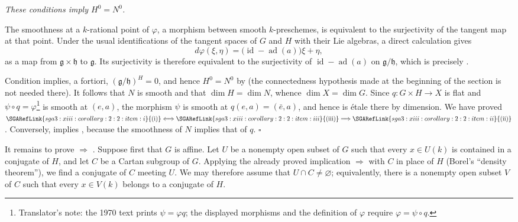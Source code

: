\textit{These conditions imply \(H^0=N^0\).}

The smoothness at a \(k\)-rational point of \(\varphi\), a morphism
between smooth \(k\)-preschemes, is equivalent to the surjectivity of
the tangent map at that point. Under the usual identifications of
the tangent spaces of \(G\) and \(H\) with their Lie algebras, a
direct calculation gives
\[
  d\varphi(\xi,\eta)
  =\bigl(\operatorname{id}-\operatorname{ad}(a)\bigr)\xi+\eta,
\]
as a map from \(\mathfrak g\times\mathfrak h\) to \(\mathfrak g\).
Its surjectivity is therefore equivalent to the surjectivity of
\(\operatorname{id}-\operatorname{ad}(a)\) on
\(\mathfrak g/\mathfrak h\), which is precisely .

Condition  implies, a fortiori,
\((\mathfrak g/\mathfrak h)^H=0\), and hence \(H^0=N^0\) by 
(the connectedness hypothesis made at the beginning of the section
is not needed there). It follows that \(N\) is smooth and that
\(\dim H=\dim N\), whence \(\dim X=\dim G\). Since
\(q:G\times H\to X\) is flat and
\(\psi\circ q=\varphi\)\footnote{Translator's note: the 1970 text
prints \(\psi=\varphi q\); the displayed morphisms and the definition of
\(\varphi\) require \(\varphi=\psi\circ q\).} is smooth
at \((e,a)\), the morphism \(\psi\)
is smooth at \(q(e,a)=(\bar e,a)\), and hence is étale there by
dimension. We have proved
\(\SGARefLink{sga3:xiii:corollary:2:2:item:i}{\mathrm{(i)}}\Longleftrightarrow\SGARefLink{sga3:xiii:corollary:2:2:item:iii}{\mathrm{(iii)}}
\Longrightarrow\SGARefLink{sga3:xiii:corollary:2:2:item:ii}{\mathrm{(ii)}}\). Conversely,  implies ,
because the smoothness of \(N\) implies that of \(q\).
\hfill\(\square\)

It remains to prove  \(\Rightarrow\) . Suppose first that
\(G\) is affine. Let \(U\) be a nonempty open subset of \(G\) such
that every \(x\in U(k)\) is contained in a conjugate of \(H\), and
let \(C\) be a Cartan subgroup of \(G\). Applying the already proved
implication  \(\Rightarrow\)  with \(C\) in place of \(H\)
(Borel's ``density theorem''), we find a conjugate of \(C\) meeting
\(U\). We may therefore assume that \(U\cap C\neq\varnothing\);
equivalently, there is a nonempty open subset \(V\) of \(C\) such
that every \(x\in V(k)\) belongs to a conjugate of \(H\).

